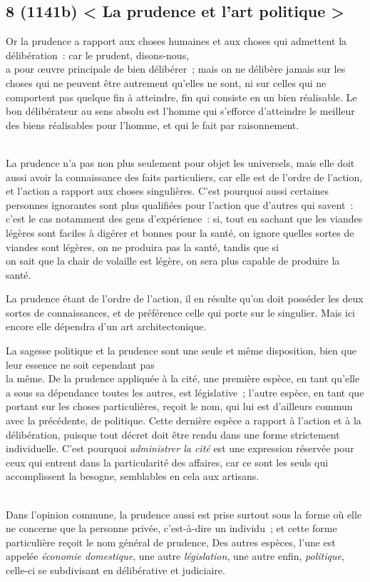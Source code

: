 \documentclass[french,twoside]{book} %
\begin{document}
\subsection[{8 (1141b) < La prudence et l’art politique >}]{8 (1141b) < La prudence et l’art politique >}
\noindent Or la prudence a rapport aux choses humaines et aux choses qui admettent la délibération : car le prudent, disons-nous, \\
a pour œuvre principale de bien délibérer ; mais on ne délibère jamais sur les choses qui ne peuvent être autrement qu’elles ne sont, ni sur celles qui ne comportent pas quelque fin à atteindre, fin qui consiste en un bien réalisable. Le bon délibérateur au sens absolu est l’homme qui s’efforce d’atteindre le meilleur des biens réalisables pour l’homme, et qui le fait par raisonnement.\par
\\
La prudence n’a pas non plus seulement pour objet les universels, mais elle doit aussi avoir la connaissance des faits particuliers, car elle est de l’ordre de l’action, et l’action a rapport aux choses singulières. C’est pourquoi aussi certaines personnes ignorantes sont plus qualifiées pour l’action que d’autres qui savent : c’est le cas notamment des gens d’expérience : si, tout en sachant que les viandes légères sont faciles à digérer et bonnes pour la santé, on ignore quelles sortes de viandes sont légères, on ne produira pas la santé, tandis que si \\
on sait que la chair de volaille est légère, on sera plus capable de produire la santé.\par
La prudence étant de l’ordre de l’action, il en résulte qu’on doit posséder les deux sortes de connaissances, et de préférence celle qui porte sur le singulier. Mais ici encore elle dépendra d’un art architectonique.\par
La sagesse politique et la prudence sont une seule et même disposition, bien que leur essence ne soit cependant pas \\
la même. De la prudence appliquée à la cité, une première espèce, en tant qu’elle a sous sa dépendance toutes les autres, est législative ; l’autre espèce, en tant que portant sur les choses particulières, reçoit le nom, qui lui est d’ailleurs commun avec la précédente, de politique. Cette dernière espèce a rapport à l’action et à la délibération, puisque tout décret doit être rendu dans une forme strictement individuelle. C’est pourquoi {\itshape administrer la cité} est une expression réservée pour ceux qui entrent dans la particularité des affaires, car ce sont les seuls qui accomplissent la besogne, semblables en cela aux artisans.\par
\\
Dans l’opinion commune, la prudence aussi est prise surtout sous la forme où elle ne concerne que la personne privée, c’est-à-dire un individu ; et cette forme particulière reçoit le nom général de prudence, Des autres espèces, l’une est appelée {\itshape économie domestique}, une autre {\itshape législation}, une autre enfin, {\itshape politique}, celle-ci se subdivisant en délibérative et judiciaire.
\end{document}
